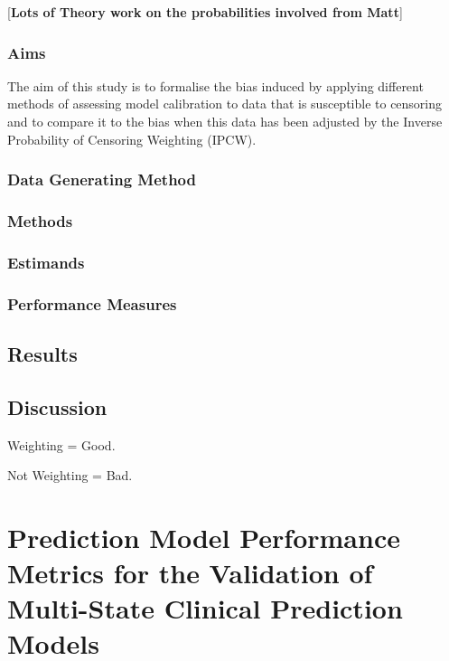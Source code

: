\documentclass[12pt,twoside]{reedthesis}
\begin{document}
{[}\textbf{Lots of Theory work on the probabilities involved from Matt}{]}

\hypertarget{aims}{%
\subsection{Aims}\label{aims}}

The aim of this study is to formalise the bias induced by applying different methods of assessing model calibration to data that is susceptible to censoring and to compare it to the bias when this data has been adjusted by the Inverse Probability of Censoring Weighting (IPCW).

\hypertarget{data-generating-method}{%
\subsection{Data Generating Method}\label{data-generating-method}}

\hypertarget{methods-3}{%
\subsection{Methods}\label{methods-3}}

\hypertarget{estimands}{%
\subsection{Estimands}\label{estimands}}

\hypertarget{performance-measures}{%
\subsection{Performance Measures}\label{performance-measures}}

\hypertarget{results}{%
\section{Results}\label{results}}

\hypertarget{discussion}{%
\section{Discussion}\label{discussion}}

Weighting = Good.

Not Weighting = Bad.

\hypertarget{chap-performance-metrics}{%
\chapter{Prediction Model Performance Metrics for the Validation of Multi-State Clinical Prediction Models}\label{chap-performance-metrics}}
\end{document}
